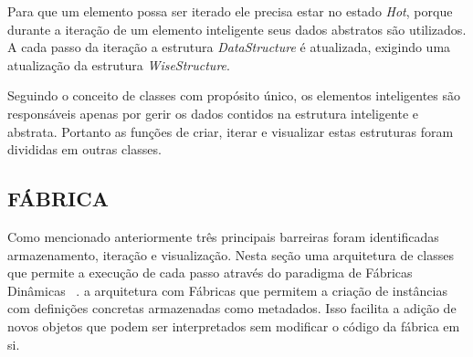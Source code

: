 Para que um elemento possa ser iterado ele precisa estar no estado \textit{Hot}, porque durante a iteração de um elemento inteligente seus dados abstratos são utilizados. A cada passo da iteração a estrutura \textit{DataStructure} é atualizada, exigindo uma atualização da estrutura \textit{WiseStructure}.

Seguindo o conceito de classes com propósito único, os elementos inteligentes são responsáveis apenas por gerir os dados contidos na estrutura inteligente e abstrata. Portanto as funções de criar, iterar e visualizar estas estruturas foram divididas em outras classes.

\subsection{FÁBRICA}\label{sec:fabrica} 

Como mencionado anteriormente três principais barreiras foram identificadas armazenamento, iteração e visualização. Nesta seção uma arquitetura de classes que permite a execução de cada passo através do paradigma de Fábricas Dinâmicas~ \cite{factorypattern}. a arquitetura com Fábricas que permitem a criação de instâncias com definições concretas armazenadas como metadados. Isso facilita a adição de novos objetos que podem ser interpretados sem modificar o código da fábrica em si. 

